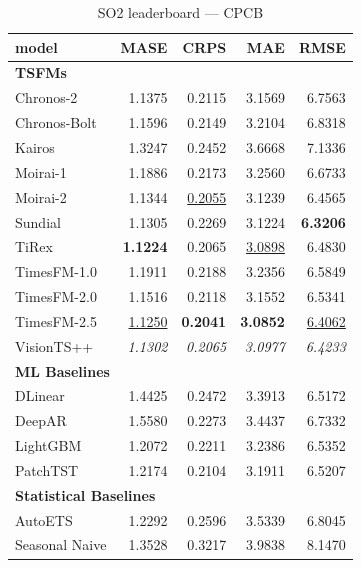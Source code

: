 \begin{table}[H]
\caption{SO2 leaderboard --- CPCB}
\centering
\begin{small}
\begin{tabular}{lrrrr}
\toprule
model & MASE & CRPS & MAE & RMSE \\
\midrule
\multicolumn{5}{l}{\textbf{TSFMs}} \\
Chronos-2 & 1.1375 & 0.2115 & 3.1569 & 6.7563 \\
Chronos-Bolt & 1.1596 & 0.2149 & 3.2104 & 6.8318 \\
Kairos & 1.3247 & 0.2452 & 3.6668 & 7.1336 \\
Moirai-1 & 1.1886 & 0.2173 & 3.2560 & 6.6733 \\
Moirai-2 & 1.1344 & \underline{0.2055} & 3.1239 & 6.4565 \\
Sundial & 1.1305 & 0.2269 & 3.1224 & \textbf{6.3206} \\
TiRex & \textbf{1.1224} & 0.2065 & \underline{3.0898} & 6.4830 \\
TimesFM-1.0 & 1.1911 & 0.2188 & 3.2356 & 6.5849 \\
TimesFM-2.0 & 1.1516 & 0.2118 & 3.1552 & 6.5341 \\
TimesFM-2.5 & \underline{1.1250} & \textbf{0.2041} & \textbf{3.0852} & \underline{6.4062} \\
VisionTS++ & \textit{1.1302} & \textit{0.2065} & \textit{3.0977} & \textit{6.4233} \\
\midrule
\multicolumn{5}{l}{\textbf{ML Baselines}} \\
DLinear & 1.4425 & 0.2472 & 3.3913 & 6.5172 \\
DeepAR & 1.5580 & 0.2273 & 3.4437 & 6.7332 \\
LightGBM & 1.2072 & 0.2211 & 3.2386 & 6.5352 \\
PatchTST & 1.2174 & 0.2104 & 3.1911 & 6.5207 \\
\midrule
\multicolumn{5}{l}{\textbf{Statistical Baselines}} \\
AutoETS & 1.2292 & 0.2596 & 3.5339 & 6.8045 \\
Seasonal Naive & 1.3528 & 0.3217 & 3.9838 & 8.1470 \\
\bottomrule
\end{tabular}
\end{small}
\end{table}